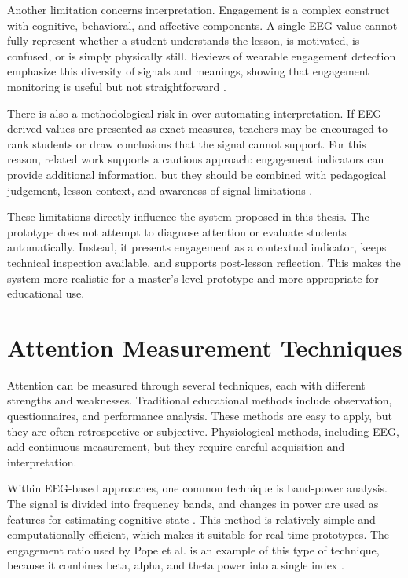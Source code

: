 Another limitation concerns interpretation. Engagement is a complex construct with cognitive, behavioral, and affective components. A single EEG value cannot fully represent whether a student understands the lesson, is motivated, is confused, or is simply physically still. Reviews of wearable engagement detection emphasize this diversity of signals and meanings, showing that engagement monitoring is useful but not straightforward \cite{BustosLopez2022}.


There is also a methodological risk in over-automating interpretation. If EEG-derived values are presented as exact measures, teachers may be encouraged to rank students or draw conclusions that the signal cannot support. For this reason, related work supports a cautious approach: engagement indicators can provide additional information, but they should be combined with pedagogical judgement, lesson context, and awareness of signal limitations \cite{Xu2018,Liang2022}.


These limitations directly influence the system proposed in this thesis. The prototype does not attempt to diagnose attention or evaluate students automatically. Instead, it presents engagement as a contextual indicator, keeps technical inspection available, and supports post-lesson reflection. This makes the system more realistic for a master's-level prototype and more appropriate for educational use.

\section{Attention Measurement Techniques}\label{sect:attmeasteq}
Attention can be measured through several techniques, each with different strengths and weaknesses. Traditional educational methods include observation, questionnaires, and performance analysis. These methods are easy to apply, but they are often retrospective or subjective. Physiological methods, including EEG, add continuous measurement, but they require careful acquisition and interpretation.


Within EEG-based approaches, one common technique is band-power analysis. The signal is divided into frequency bands, and changes in power are used as features for estimating cognitive state \cite{Niedermeyer2005}. This method is relatively simple and computationally efficient, which makes it suitable for real-time prototypes. The engagement ratio used by Pope et al. is an example of this type of technique, because it combines beta, alpha, and theta power into a single index \cite{Pope1995}.


